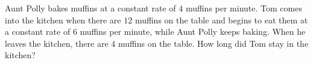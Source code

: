 Aunt Polly bakes muffins at a constant rate of $4$ muffins per minute. Tom comes into the kitchen when there are $12$ muffins on the table and begins to eat them at a constant rate of $6$ muffins per minute, while Aunt Polly keeps baking. When he leaves the kitchen, there are $4$ muffins on the table. How long did Tom stay in the kitchen?
